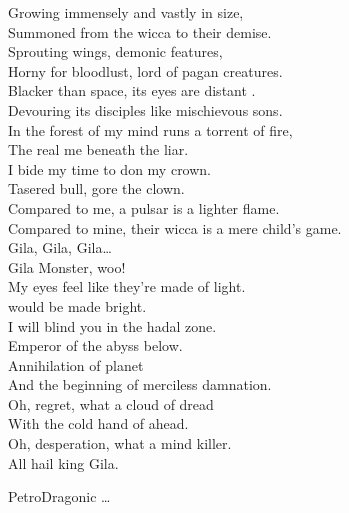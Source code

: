 
Growing immensely and vastly in size, \\
Summoned from the wicca to their demise. \\
Sprouting wings, demonic features, \\
Horny for bloodlust, lord of pagan creatures. \\
Blacker than space, its eyes are distant . \\
Devouring its disciples like mischievous sons. \\

In the forest of my mind runs a torrent of fire, \\
The real me beneath the liar. \\
I bide my time to don my crown. \\
Tasered bull, gore the clown. \\
Compared to me, a pulsar is a lighter flame. \\
Compared to mine, their wicca is a mere child's game. \\

Gila, Gila, Gila… \\
Gila Monster, woo! \\

My eyes feel like they're made of light. \\
 would be made bright. \\
I will blind you in the hadal zone. \\
Emperor of the abyss below. \\

Annihilation of planet  \\
And the beginning of merciless damnation. \\

Oh, regret, what a cloud of dread \\
With the cold hand of  ahead. \\
Oh, desperation, what a mind killer. \\
All hail king Gila. \\




PetroDragonic … \\

